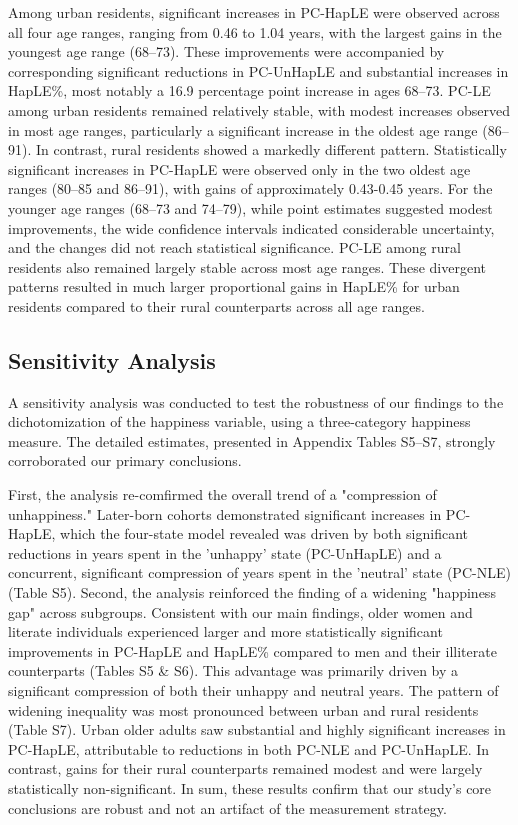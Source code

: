 \documentclass[12pt, a4paper]{article}
\begin{document}
Among urban residents, significant increases in PC-HapLE were observed across all four age ranges, ranging from 0.46 to 1.04 years, with the largest gains in the youngest age range (68–73). These improvements were accompanied by corresponding significant reductions in PC-UnHapLE and substantial increases in HapLE\%, most notably a 16.9 percentage point increase in ages 68–73. PC-LE among urban residents remained relatively stable, with modest increases observed in most age ranges, particularly a significant increase in the oldest age range (86–91). In contrast, rural residents showed a markedly different pattern. Statistically significant increases in PC-HapLE were observed only in the two oldest age ranges (80–85 and 86–91), with gains of approximately 0.43-0.45 years. For the younger age ranges (68–73 and 74–79), while point estimates suggested modest improvements, the wide confidence intervals indicated considerable uncertainty, and the changes did not reach statistical significance. PC-LE among rural residents also remained largely stable across most age ranges. These divergent patterns resulted in much larger proportional gains in HapLE\% for urban residents compared to their rural counterparts across all age ranges.

\subsection{Sensitivity Analysis}

A sensitivity analysis was conducted to test the robustness of our findings to the dichotomization of the happiness variable, using a three-category happiness measure. The detailed estimates, presented in Appendix Tables S5–S7, strongly corroborated our primary conclusions.

First, the analysis re-comfirmed the overall trend of a "compression of unhappiness." Later-born cohorts demonstrated significant increases in PC-HapLE, which the four-state model revealed was driven by both significant reductions in years spent in the 'unhappy' state (PC-UnHapLE) and a concurrent, significant compression of years spent in the 'neutral' state (PC-NLE) (Table S5). Second, the analysis reinforced the finding of a widening "happiness gap" across subgroups. Consistent with our main findings, older women and literate individuals experienced larger and more statistically significant improvements in PC-HapLE and HapLE\% compared to men and their illiterate counterparts (Tables S5 \& S6). This advantage was primarily driven by a significant compression of both their unhappy and neutral years. The pattern of widening inequality was most pronounced between urban and rural residents (Table S7). Urban older adults saw substantial and highly significant increases in PC-HapLE, attributable to reductions in both PC-NLE and PC-UnHapLE. In contrast, gains for their rural counterparts remained modest and were largely statistically non-significant. In sum, these results confirm that our study's core conclusions are robust and not an artifact of the measurement strategy.
\end{document}
